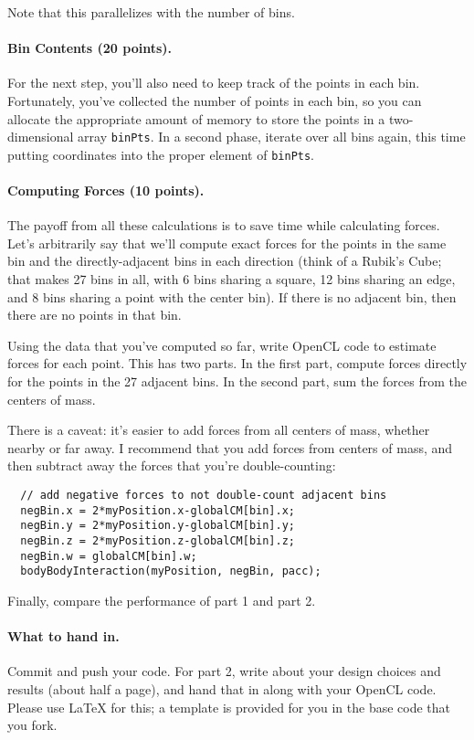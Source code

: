 \documentclass[letterpaper,10pt]{article}
\begin{document}
\noindent
Note that this parallelizes with the number of bins.

\paragraph{Bin Contents (20 points).}
For the next step, you'll also need to keep track of the points in
each bin. Fortunately, you've collected the number of points in each
bin, so you can allocate the appropriate amount of memory to store the
points in a two-dimensional array {\tt binPts}. In a second phase,
iterate over all bins again, this time putting coordinates into the
proper element of {\tt binPts}.

\paragraph{Computing Forces (10 points).}
The payoff from all these calculations is to save time while
calculating forces. Let's arbitrarily say that we'll compute exact
forces for the points in the same bin and the directly-adjacent bins
in each direction (think of a Rubik's Cube; that makes 27 bins in all,
with 6 bins sharing a square, 12 bins sharing an edge, and 8 bins
sharing a point with the center bin). If there is no adjacent bin,
then there are no points in that bin. 

Using the data that you've
computed so far, write OpenCL code to estimate forces for each point.
This has two parts. In the first part, compute forces directly for the 
points in the 27 adjacent bins. In the second part, 
sum the forces from the centers of mass. 

There is a caveat: it's easier to add forces from all centers of mass,
whether nearby or far away. I recommend that you add forces from centers
of mass, and then subtract away the forces that you're double-counting:

\begin{verbatim}
  // add negative forces to not double-count adjacent bins
  negBin.x = 2*myPosition.x-globalCM[bin].x;
  negBin.y = 2*myPosition.y-globalCM[bin].y;
  negBin.z = 2*myPosition.z-globalCM[bin].z;
  negBin.w = globalCM[bin].w;
  bodyBodyInteraction(myPosition, negBin, pacc);
\end{verbatim}

Finally, compare the performance of part 1 and part 2.

\paragraph{What to hand in.} Commit and push your code.
For part 2,
write about your design choices and results (about half a page), and
hand that in along with your OpenCL code. Please use LaTeX for this; a template is provided for you in the base code that you fork. 
\end{document}

